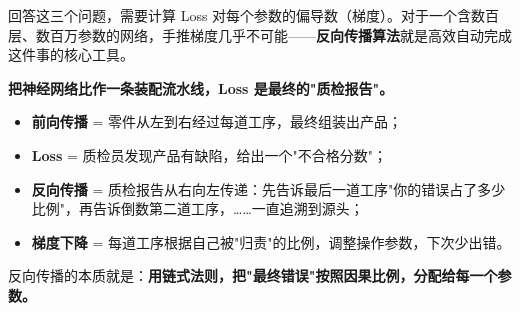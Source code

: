 \documentclass[a4paper,11pt]{ctexart}
\begin{document}
回答这三个问题，需要计算 Loss 对每个参数的偏导数（梯度）。对于一个含数百层、数百万参数的网络，手推梯度几乎不可能——\textbf{反向传播算法}就是高效自动完成这件事的核心工具。

\begin{metaphorbox}
    \textbf{把神经网络比作一条装配流水线，Loss 是最终的"质检报告"。}

    \begin{itemize}
        \item \textbf{前向传播} = 零件从左到右经过每道工序，最终组装出产品；
        \item \textbf{Loss} = 质检员发现产品有缺陷，给出一个"不合格分数"；
        \item \textbf{反向传播} = 质检报告从右向左传递：先告诉最后一道工序"你的错误占了多少比例"，再告诉倒数第二道工序，……一直追溯到源头；
        \item \textbf{梯度下降} = 每道工序根据自己被"归责"的比例，调整操作参数，下次少出错。
    \end{itemize}

    反向传播的本质就是：\textbf{用链式法则，把"最终错误"按照因果比例，分配给每一个参数。}
\end{metaphorbox}
\end{document}
